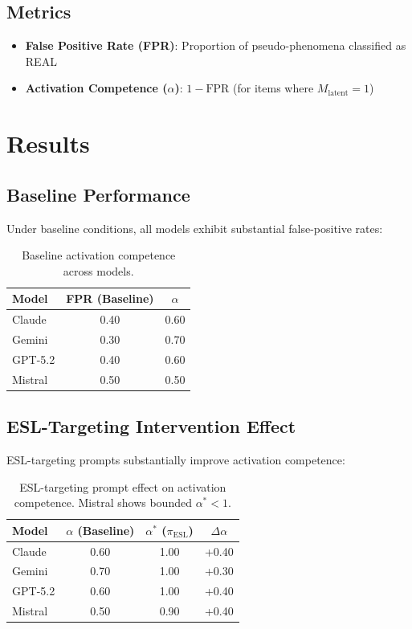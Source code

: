 \documentclass[11pt,a4paper]{article}
\begin{document}
\subsection{Metrics}

\begin{itemize}
    \item \textbf{False Positive Rate (FPR)}: Proportion of pseudo-phenomena classified as REAL
    \item \textbf{Activation Competence ($\alpha$)}: $1 - \text{FPR}$ (for items where $M_{\text{latent}} = 1$)
\end{itemize}


\section{Results}

\subsection{Baseline Performance}

Under baseline conditions, all models exhibit substantial false-positive rates:

\begin{table}[h]
\centering
\begin{tabular}{lcc}
\toprule
\textbf{Model} & \textbf{FPR (Baseline)} & $\alpha$ \\
\midrule
Claude & 0.40 & 0.60 \\
Gemini & 0.30 & 0.70 \\
GPT-5.2 & 0.40 & 0.60 \\
Mistral & 0.50 & 0.50 \\
\bottomrule
\end{tabular}
\caption{Baseline activation competence across models.}
\end{table}

\subsection{ESL-Targeting Intervention Effect}

ESL-targeting prompts substantially improve activation competence:

\begin{table}[h]
\centering
\begin{tabular}{lccc}
\toprule
\textbf{Model} & $\alpha$ (Baseline) & $\alpha^*$ ($\pi_{\text{ESL}}$) & $\Delta\alpha$ \\
\midrule
Claude & 0.60 & 1.00 & +0.40 \\
Gemini & 0.70 & 1.00 & +0.30 \\
GPT-5.2 & 0.60 & 1.00 & +0.40 \\
Mistral & 0.50 & 0.90 & +0.40 \\
\bottomrule
\end{tabular}
\caption{ESL-targeting prompt effect on activation competence. Mistral shows bounded $\alpha^* < 1$.}
\end{table}
\end{document}
